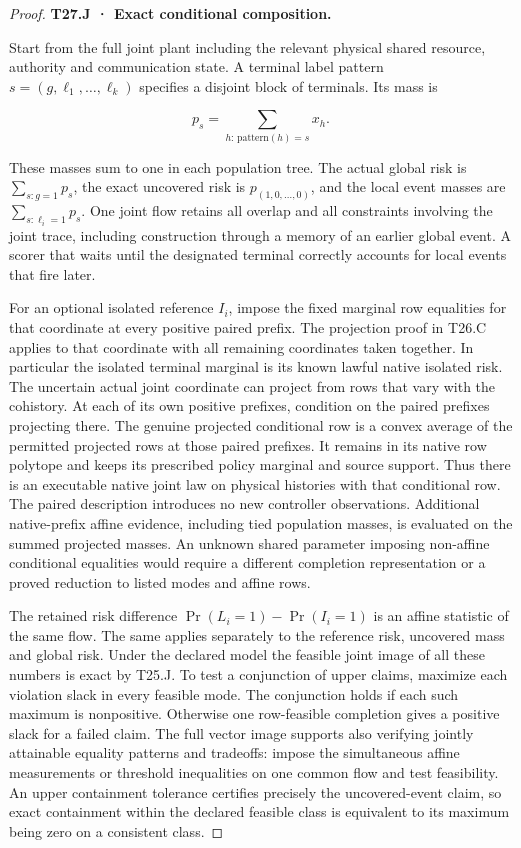 \begin{proof}
\textbf{T27.J · Exact conditional composition.}

Start from the full joint plant including the relevant physical shared resource, authority and communication state. A terminal label pattern \(s=(g,\ell_1,\ldots,\ell_k)\) specifies a disjoint block of terminals. Its mass is

\[
p_s=\sum_{h:\,\mathrm{pattern}(h)=s}x_h.
\]

These masses sum to one in each population tree. The actual global risk is \(\sum_{s:g=1}p_s\), the exact uncovered risk is \(p_{(1,0,\ldots,0)}\), and the local event masses are \(\sum_{s:\ell_i=1}p_s\). One joint flow retains all overlap and all constraints involving the joint trace, including construction through a memory of an earlier global event. A scorer that waits until the designated terminal correctly accounts for local events that fire later.

For an optional isolated reference \(I_i\), impose the fixed marginal row equalities for that coordinate at every positive paired prefix. The projection proof in T26.C applies to that coordinate with all remaining coordinates taken together. In particular the isolated terminal marginal is its known lawful native isolated risk. The uncertain actual joint coordinate can project from rows that vary with the cohistory. At each of its own positive prefixes, condition on the paired prefixes projecting there. The genuine projected conditional row is a convex average of the permitted projected rows at those paired prefixes. It remains in its native row polytope and keeps its prescribed policy marginal and source support. Thus there is an executable native joint law on physical histories with that conditional row. The paired description introduces no new controller observations. Additional native-prefix affine evidence, including tied population masses, is evaluated on the summed projected masses. An unknown shared parameter imposing non-affine conditional equalities would require a different completion representation or a proved reduction to listed modes and affine rows.

The retained risk difference \(\Pr(L_i=1)-\Pr(I_i=1)\) is an affine statistic of the same flow. The same applies separately to the reference risk, uncovered mass and global risk. Under the declared model the feasible joint image of all these numbers is exact by T25.J. To test a conjunction of upper claims, maximize each violation slack in every feasible mode. The conjunction holds if each such maximum is nonpositive. Otherwise one row-feasible completion gives a positive slack for a failed claim. The full vector image supports also verifying jointly attainable equality patterns and tradeoffs: impose the simultaneous affine measurements or threshold inequalities on one common flow and test feasibility. An upper containment tolerance certifies precisely the uncovered-event claim, so exact containment within the declared feasible class is equivalent to its maximum being zero on a consistent class.


\end{proof}
